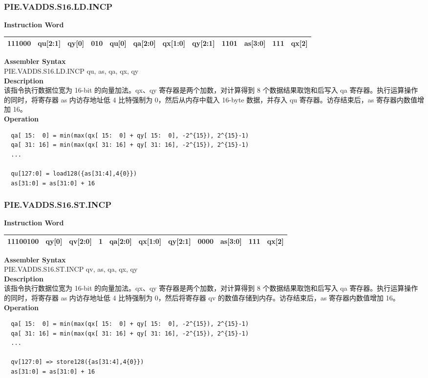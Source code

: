 \newpage
\subsubsection{PIE.VADDS.S16.LD.INCP}\label{instruction:PIEVADDSS16LDINCP}
\setlength\tabcolsep{6pt}
\textbf{Instruction Word} \\
\begin{tabular}{|c|c|c|c|c|c|c|c|c|c|c|c|}
	\hline
	111000 & qu[2:1] & qy[0] & 010 & qu[0] & qa[2:0] & qx[1:0] & qy[2:1] & 1101 & as[3:0] & 111 & qx[2] \\
	\hline
\end{tabular}

\textbf{Assembler Syntax} \\
PIE.VADDS.S16.LD.INCP qu, as, qa, qx, qy \\
\textbf{Description} \\
该指令执行数据位宽为 16-bit 的向量加法。qx、qy 寄存器是两个加数，对计算得到 8 个数据结果取饱和后写入 qa 寄存器。执行运算操作的同时，将寄存器 as 内访存地址低 4 比特强制为 0，然后从内存中载入 16-byte 数据，并存入 qu 寄存器。访存结束后，as 寄存器内数值增加 16。\\
\textbf{Operation}
\begin{lstlisting}
  qa[ 15:  0] = min(max(qx[ 15:  0] + qy[ 15:  0], -2^{15}), 2^{15}-1)
  qa[ 31: 16] = min(max(qx[ 31: 16] + qy[ 31: 16], -2^{15}), 2^{15}-1)
  ...

  qu[127:0] = load128({as[31:4],4{0}})
  as[31:0] = as[31:0] + 16
\end{lstlisting}

\newpage
\subsubsection{PIE.VADDS.S16.ST.INCP}\label{instruction:PIEVADDSS16STINCP}
\setlength\tabcolsep{6pt}
\textbf{Instruction Word} \\
\begin{tabular}{|c|c|c|c|c|c|c|c|c|c|c|}
	\hline
	11100100 & qy[0] & qv[2:0] & 1 & qa[2:0] & qx[1:0] & qy[2:1] & 0000 & as[3:0] & 111 & qx[2] \\
	\hline
\end{tabular}

\textbf{Assembler Syntax} \\
PIE.VADDS.S16.ST.INCP qv, as, qa, qx, qy \\
\textbf{Description} \\
该指令执行数据位宽为 16-bit 的向量加法。qx、qy 寄存器是两个加数，对计算得到 8 个数据结果取饱和后写入 qa 寄存器。执行运算操作的同时，将寄存器 as 内访存地址低 4 比特强制为 0，然后将寄存器 qv 的数值存储到内存。访存结束后，as 寄存器内数值增加 16。\\
\textbf{Operation}
\begin{lstlisting}
  qa[ 15:  0] = min(max(qx[ 15:  0] + qy[ 15:  0], -2^{15}), 2^{15}-1)
  qa[ 31: 16] = min(max(qx[ 31: 16] + qy[ 31: 16], -2^{15}), 2^{15}-1)
  ...

  qv[127:0] => store128({as[31:4],4{0}})
  as[31:0] = as[31:0] + 16
\end{lstlisting}

